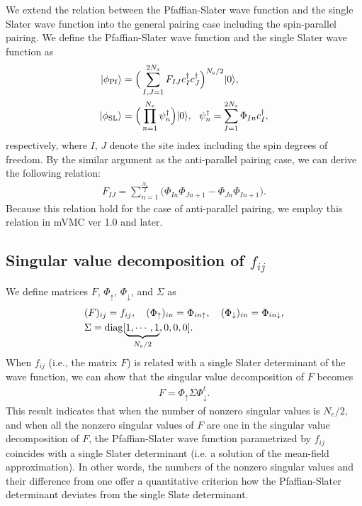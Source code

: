 We extend the relation between the Pfaffian-Slater wave function and the single Slater wave function
into the general pairing case including the spin-parallel pairing.
We define the Pfaffian-Slater wave function and the single Slater wave function as
\begin{align}
|\phi_{\rm Pf}\rangle&=\Big(\sum_{I,J=1}^{2N_{s}}F_{IJ}c_{I}^{\dagger}c_{J}^{\dagger}\Big)^{N_{\rm e}/2}|0\rangle, \\
|\phi_{\rm SL}\rangle&=\Big(\prod_{n=1}^{N_{e}}\psi_{n}^{\dagger}\Big)|0\rangle,~~\psi_{n}^{\dagger}=\sum_{I=1}^{2N_{s}}\Phi_{In}c^{\dagger}_{I},
\end{align}
respectively, where $I$, $J$ denote the site index including the spin degrees of freedom.
By the similar argument as the anti-parallel pairing case,
we can derive the following relation:
\begin{align}
F_{IJ}=\sum_{n=1}^{\frac{N_{e}}{2}}\Big(\Phi_{In}\Phi_{Jn+1}-\Phi_{Jn}\Phi_{In+1}\Big).
\end{align}
Because this relation hold for the case of anti-parallel pairing, we employ this relation in mVMC ver 1.0 and later.

\subsection{Singular value decomposition of $f_{ij}$}
\label{sec:PfaffianSingular}

We define matrices $F$, $\Phi_{\uparrow}$, $\Phi_{\downarrow}$, and $\Sigma$ as
\begin{align}
&(F)_{ij}=f_{ij},~~~ 
(\Phi_{\uparrow})_{in}=\Phi_{in\uparrow},~~~ 
(\Phi_{\downarrow})_{in}=\Phi_{in\downarrow}, \\
&\Sigma={\rm diag}[\underbrace{1,\cdots,1}_{N_e/2},0,0,0].
\end{align}
When $f_{ij}$ (i.e., the matrix $F$) is related with a single Slater determinant
of the wave function, we can show that the singular value decomposition of $F$ becomes
\begin{align}
F=\Phi_{\uparrow}\Sigma\Phi_{\downarrow}^{t}.
\end{align}
This result indicates that when the number of nonzero singular values is $N_{e}/2$, 
and when all the nonzero singular values of $F$ are one in the singular value decomposition of $F$,
the Pfaffian-Slater wave function parametrized by $f_{ij}$ coincides with a single Slater determinant
(i.e. a solution of the mean-field approximation).
In other words, the numbers of the nonzero singular values and their difference from one offer 
a quantitative criterion how the Pfaffian-Slater determinant deviates from the single Slate determinant.

